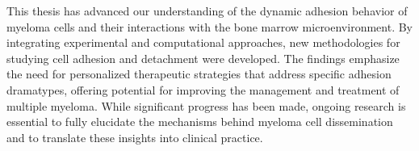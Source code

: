 This thesis has advanced our understanding of the dynamic adhesion behavior of
myeloma cells and their interactions with the bone marrow microenvironment. By
integrating experimental and computational approaches, new methodologies for
studying cell adhesion and detachment were developed. The findings emphasize the
need for personalized therapeutic strategies that address specific adhesion
dramatypes, offering potential for improving the management and treatment of
multiple myeloma. While significant progress has been made, ongoing research is
essential to fully elucidate the mechanisms behind myeloma cell dissemination
and to translate these insights into clinical practice.






